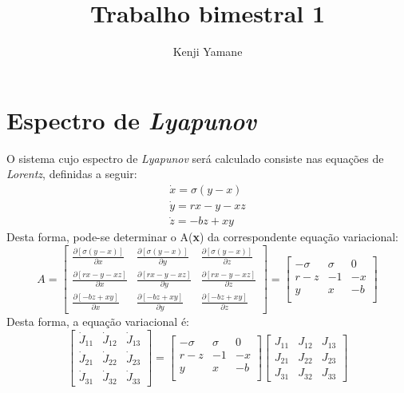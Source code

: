\documentclass{article}[twocolumn]
\title{Trabalho bimestral 1}
\author{Kenji Yamane}
\begin{document}
	\maketitle
	\section{Espectro de \textit{Lyapunov}}
	O sistema cujo espectro de \textit{Lyapunov} ser\'a calculado consiste nas equa\c{c}\~oes
	de \textit{Lorentz}, definidas a seguir:
	\begin{equation}
		\begin{array}{l}
			\dot{x} = \sigma (y - x)\\
			\dot{y} = rx - y - xz\\
			\dot{z} = -bz + xy
		\end{array}
		\nonumber
	\end{equation}
	Desta forma, pode-se determinar o A(\textbf{x}) da correspondente equa\c{c}\~ao variacional:
	\begin{equation}
		A = \left[\begin{array}{ccc}
			\frac{\partial [\sigma (y - x)]}{\partial x} &
			\frac{\partial [\sigma (y - x)]}{\partial y} &
			\frac{\partial [\sigma (y - x)]}{\partial z} \\
			\frac{\partial [rx - y - xz]}{\partial x} &
			\frac{\partial [rx - y - xz]}{\partial y} &
			\frac{\partial [rx - y - xz]}{\partial z} \\
			\frac{\partial [-bz + xy]}{\partial x} &
			\frac{\partial [-bz + xy]}{\partial y} &
			\frac{\partial [-bz + xy]}{\partial z}
		\end{array}\right] =
		\left[\begin{array}{ccc}
			-\sigma & \sigma & 0 \\
			r - z & -1 & -x \\
			y & x & -b \\
		\end{array}\right]
		\nonumber
	\end{equation}
	Desta forma, a equa\c{c}\~ao variacional \'e:
	\begin{equation}
		\left[\begin{array}{ccc}
			\dot{J}_{11} & \dot{J}_{12} & \dot{J}_{13}\\
			\dot{J}_{21} & \dot{J}_{22} & \dot{J}_{23}\\
			\dot{J}_{31} & \dot{J}_{32} & \dot{J}_{33}
		\end{array}\right] =
		\left[\begin{array}{ccc}
			-\sigma & \sigma & 0 \\
			r - z & -1 & -x \\
			y & x & -b \\
		\end{array}\right]
		\left[\begin{array}{ccc}
			J_{11} & J_{12} & J_{13}\\
			J_{21} & J_{22} & J_{23}\\
			J_{31} & J_{32} & J_{33}
		\end{array}\right]
		\nonumber
	\end{equation}
\end{document}
